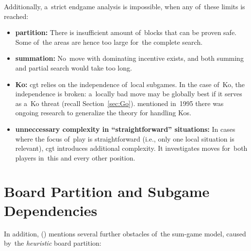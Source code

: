 Additionally, a~strict endgame analysis is impossible, when any of~these limits is reached:
\begin{itemize}[-]
  \item \textbf{partition:}
    There is insufficient amount of~blocks that can be proven safe.
    Some of~the areas are hence too large for~the complete search.

  \item \textbf{summation:}
    No~move with dominating incentive\footnotemark{} exists, and both summing and partial search would take too long.

  \item \textbf{Ko:}
    \acrshort{cgt} relies on the independence of~local subgames.
    In the case of~Ko, the independence is broken:
    a~locally bad move may be globally best if it serves as a~Ko threat (recall Section~\ref{sec:Go}).
    \Mueller{} mentioned in~1995 there was ongoing research to generalize the theory for handling Kos.

  \item \textbf{unneccessary complexity in ``straightforward'' situations:}
    In cases where the focus of~play is straightforward (i.e., only one local situation is relevant), \acrshort{cgt} introduces additional complexity.
    It investigates moves for~both players in~this and every other position.
\end{itemize}

\section{Board Partition and Subgame Dependencies}
In addition, (\cite{Muller1995computer}) mentions several further obstacles of~the sum-game model, caused by~the \emph{heuristic} board partition:

